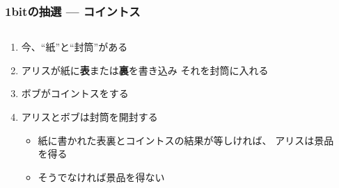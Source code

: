 \begin{frame}
  \frametitle{1bitの抽選 --- コイントス}

  \pause
  \begin{exampleblock}{}
    \begin{columns}
      \begin{column}{0.8\textwidth}
        \begin{enumerate}
          \item<+-> 今、``紙''と``封筒''がある
          \item<+-> アリスが紙に\textbf{表}または\textbf{裏}を書き込み
          それを封筒に入れる
          \item<+-> ボブがコイントスをする
          \item<+-> アリスとボブは封筒を開封する
          \begin{itemize}
            \item 紙に書かれた表裏とコイントスの結果が等しければ、
            アリスは景品を得る
            \item そうでなければ景品を得ない
          \end{itemize}
        \end{enumerate}
      \end{column}
      \begin{column}{0.2\textwidth}
        \begin{center}
\end{center}
\end{column}
\end{columns}
\end{exampleblock}
\end{frame}
